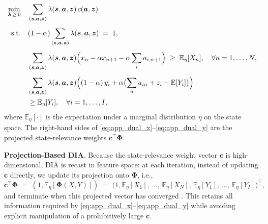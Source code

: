 \documentclass[sglanonrev]{informs4}
\providecommand{\bPhi}{\boldsymbol{\Phi}}
\providecommand{\bc}{\boldsymbol{c}}
\begin{document}
\begin{APPENDICES}
\scriptsize
\begin{align} 
\min_{\boldsymbol{\lambda}\,\geq\,0}\quad
& \sum_{(\boldsymbol{s},\boldsymbol{a},\boldsymbol{z})}
   \lambda(\boldsymbol{s},\boldsymbol{a},\boldsymbol{z})\,
   c(\boldsymbol{a},\boldsymbol{z})\notag \\[4pt] 
\text{s.t.}\quad
& (1-\alpha)
  \sum_{(\boldsymbol{s},\boldsymbol{a},\boldsymbol{z})}
  \lambda(\boldsymbol{s},\boldsymbol{a},\boldsymbol{z}) \;=\; 1,
  \label{eq:app_dual_norm} \\[4pt]
& \sum_{(\boldsymbol{s},\boldsymbol{a},\boldsymbol{z})}
  \lambda(\boldsymbol{s},\boldsymbol{a},\boldsymbol{z})
  \Bigl( x_n - \alpha x_{n+1} - \alpha \sum_{i} a_{i,n+1} \Bigr)
  \;\ge\; \mathbb{E}_{\eta}[X_n],
  \quad \forall n=1,\ldots,N,
  \label{eq:app_dual_x} \\[4pt]
& \sum_{(\boldsymbol{s},\boldsymbol{a},\boldsymbol{z})}
  \lambda(\boldsymbol{s},\boldsymbol{a},\boldsymbol{z})
  \Bigl( (1-\alpha)\,y_i
  + \alpha \bigl( \sum_{n} a_{in}+z_i-\mathbb{E}[Y_i] \bigr) \Bigr)
  \notag\\
&\hfill \ge \mathbb{E}_{\eta}[Y_i],
  \quad \forall i=1,\ldots,I,
  \label{eq:app_dual_y}
\end{align}
\small
where $\mathbb{E}_{\eta}[\cdot]$ is the expectation under a marginal distribution $\eta$ on the state space. The right-hand sides of \eqref{eq:app_dual_x}--\eqref{eq:app_dual_y} are the projected state-relevance weights $\bc^{\top}\bPhi$.

\textbf{Projection-Based \ac{DIA}}.
Because the state-relevance weight vector $\bc$ is high-dimensional, \ac{DIA} is recast in feature space: at each iteration, instead of updating
$\bc$ directly, we update its projection onto $\bPhi$, i.e.,
\[
  \bc^{\top}\bPhi \;=\; \left(1,\mathbb{E}_{\eta}\!\left[\bPhi(X,Y)\right]\right)
  \;=\;
  \bigl(1, \mathbb{E}_{\eta}[X_1],\,\ldots,\,\mathbb{E}_{\eta}[X_N],\,
        \mathbb{E}_{\eta}[Y_1],\,\ldots,\,\mathbb{E}_{\eta}[Y_I]\bigr)^{\top},
\]
and terminate when this projected vector has converged \citep{de2008choosing}. This retains all information required by \eqref{eq:app_dual_x}--\eqref{eq:app_dual_y} while avoiding explicit manipulation of a prohibitively large $\bc$.



\end{APPENDICES}
\end{document}
